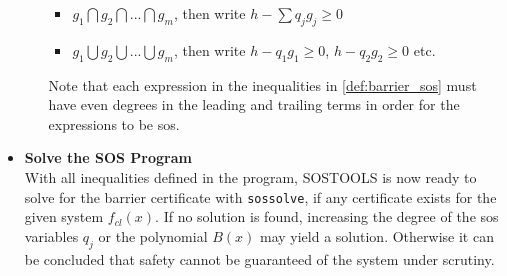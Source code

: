 \begin{itemize}
\begin{itemize}
		\begin{itemize}
			\item $g_1 \bigcap g_2 \bigcap ... \bigcap g_m$, then write $h - \sum q_jg_j\geq 0$
			\item $g_1 \bigcup g_2 \bigcup ... \bigcup g_m$, then write $h - q_1g_1\geq 0$, $h - q_2g_2\geq 0$ etc.
		\end{itemize} 
		Note that each expression in the inequalities in \autoref{def:barrier_sos} must have even degrees in the leading and trailing terms in order for the expressions to be \gls{sos}.
	\end{itemize}
	\item \textbf{Solve the SOS Program}\\
	With all inequalities defined in the program, SOSTOOLS is now ready to solve for the barrier certificate with \texttt{sossolve}, if any certificate exists for the given system $f_{cl}(x)$. If no solution is found, increasing the degree of the \gls{sos} variables $q_j$ or the polynomial $B(x)$ may yield a solution. Otherwise it can be concluded that safety cannot be guaranteed of the  system under scrutiny. 
\end{itemize}











